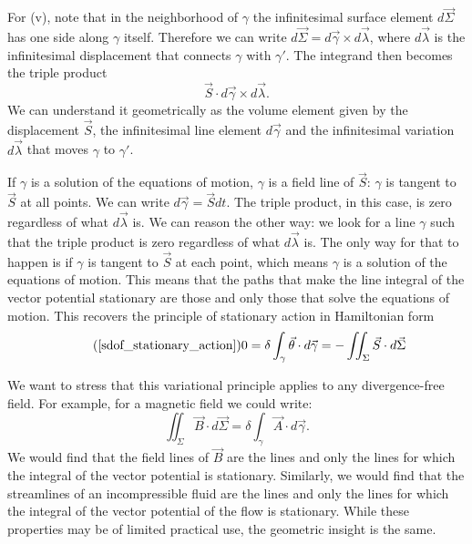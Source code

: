 \documentclass[fleqn,10pt]{wlscirep}
\begin{document}
For (v), note that in the neighborhood of $\gamma$ the infinitesimal surface element $d\vec{\Sigma}$ has one side along $\gamma$ itself. Therefore we can write $d\vec{\Sigma} = d\vec{\gamma} \times d\vec{\lambda}$, where $d\vec{\lambda}$ is the infinitesimal displacement that connects $\gamma$ with $\gamma'$. The integrand then becomes the triple product
\begin{equation}
	\vec{S} \cdot d\vec{\gamma} \times d\vec{\lambda}.
\end{equation}
We can understand it geometrically as the volume element given by the displacement $\vec{S}$, the infinitesimal line element $d\vec{\gamma}$ and the infinitesimal variation $d\vec{\lambda}$ that moves $\gamma$ to $\gamma'$.

If $\gamma$ is a solution of the equations of motion, $\gamma$ is a field line of $\vec{S}$: $\gamma$ is tangent to $\vec{S}$ at all points. We can write $d\vec{\gamma} = \vec{S} dt$. The triple product, in this case, is zero regardless of what $d\vec{\lambda}$ is. We can reason the other way: we look for a line $\gamma$ such that the triple product is zero regardless of what $d\vec{\lambda}$ is. The only way for that to happen is if $\gamma$ is tangent to $\vec{S}$ at each point, which means $\gamma$ is a solution of the equations of motion. This means that the paths that make the line integral of the vector potential stationary are those and only those that solve the equations of motion. This recovers the principle of stationary action in Hamiltonian form
\begin{equation}
\tag*{(\ref{sdof_stationary_action})}
	0 =\delta \int_{\gamma} \vec{\theta} \cdot d\vec{\gamma} = - \iint_{\Sigma} \vec{S} \cdot d\vec{\Sigma} 
\end{equation}

We want to stress that this variational principle applies to any divergence-free field. For example, for a magnetic field we could write:
\begin{equation}
	\iint_{\Sigma} \vec{B} \cdot d\vec{\Sigma} = \delta \int_{\gamma} \vec{A} \cdot d\vec{\gamma}.
\end{equation}
We would find that the field lines of $\vec{B}$ are the lines and only the lines for which the integral of the vector potential is stationary. Similarly, we would find that the streamlines of an incompressible fluid are the lines and only the lines for which the integral of the vector potential of the flow is stationary. While these properties may be of limited practical use, the geometric insight is the same.
\end{document}
